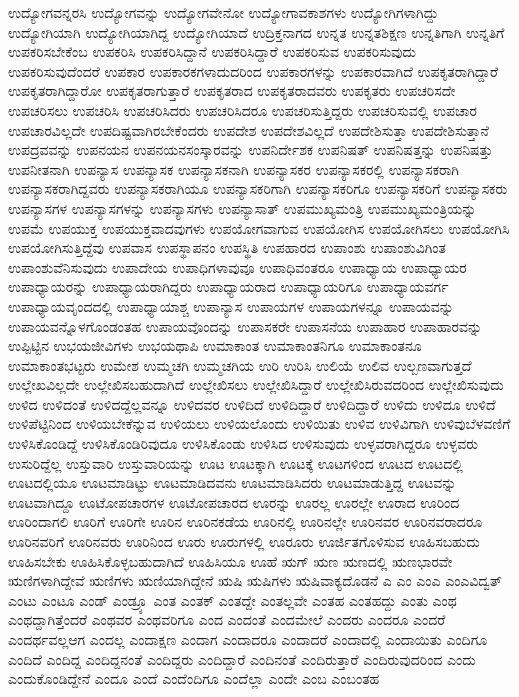 {ಉದ್ಯೋಗವನ್ನರಸಿ
ಉದ್ಯೋಗವನ್ನು
ಉದ್ಯೋಗವೇನೋ
ಉದ್ಯೋಗಾವಕಾಶಗಳು
ಉದ್ಯೋಗಿಗಳಾಗಿದ್ದು
ಉದ್ಯೋಗಿಯಾಗಿ
ಉದ್ಯೋಗಿಯಾಗಿದ್ದ
ಉದ್ಯೋಗಿಯಾದೆ
ಉದ್ರಿಕ್ತನಾಗದ
ಉನ್ನತ
ಉನ್ನತಶಿಕ್ಷಣ
ಉನ್ನತಿಗಾಗಿ
ಉನ್ನತಿಗೆ
ಉಪಕರಿಸಬೇಕೆಂಬ
ಉಪಕರಿಸಿ
ಉಪಕರಿಸಿದ್ದಾನೆ
ಉಪಕರಿಸಿದ್ದಾರೆ
ಉಪಕರಿಸುವ
ಉಪಕರಿಸುವುದು
ಉಪಕರಿಸುವುದೆಂದರೆ
ಉಪಕಾರ
ಉಪಕಾರಕಗಳಾದುದರಿಂದ
ಉಪಕಾರಗಳನ್ನು
ಉಪಕಾರವಾಗಿದೆ
ಉಪಕೃತರಾಗಿದ್ದಾರೆ
ಉಪಕೃತರಾಗಿದ್ದಾರೋ
ಉಪಕೃತರಾಗುತ್ತಾರೆ
ಉಪಕೃತರಾದ
ಉಪಕೃತರಾದವರು
ಉಪಕೃತರು
ಉಪಚರಿಸದೇ
ಉಪಚರಿಸಲು
ಉಪಚರಿಸಿ
ಉಪಚರಿಸಿದರು
ಉಪಚರಿಸಿದರೂ
ಉಪಚರಿಸುತ್ತಿದ್ದರು
ಉಪಚರಿಸುವಲ್ಲಿ
ಉಪಚಾರ
ಉಪಚಾರವಿಲ್ಲದೇ
ಉಪದಿಷ್ಟವಾಗಿರಬೇಕೆಂದರು
ಉಪದೇಶ
ಉಪದೇಶವಿಲ್ಲದೆ
ಉಪದೇಶಿಸುತ್ತಾ
ಉಪದೇಶಿಸುತ್ತಾನೆ
ಉಪದ್ರವವನ್ನು
ಉಪನಯನ
ಉಪನಯನಸಂಸ್ಕಾರವನ್ನು
ಉಪನಿರ್ದೇಶಕ
ಉಪನಿಷತ್
ಉಪನಿಷತ್ತನ್ನು
ಉಪನಿಷತ್ತು
ಉಪನೀತನಾಗಿ
ಉಪನ್ಯಾಸ
ಉಪನ್ಯಾಸಕ
ಉಪನ್ಯಾಸಕನಾಗಿ
ಉಪನ್ಯಾಸಕರ
ಉಪನ್ಯಾಸಕರಲ್ಲಿ
ಉಪನ್ಯಾಸಕರಾಗಿ
ಉಪನ್ಯಾಸಕರಾಗಿದ್ದವರು
ಉಪನ್ಯಾಸಕರಾಗಿಯೂ
ಉಪನ್ಯಾಸಕರಿಗಾಗಿ
ಉಪನ್ಯಾಸಕರಿಗೂ
ಉಪನ್ಯಾಸಕರಿಗೆ
ಉಪನ್ಯಾಸಕರು
ಉಪನ್ಯಾಸಗಳ
ಉಪನ್ಯಾಸಗಳನ್ನು
ಉಪನ್ಯಾಸಗಳು
ಉಪನ್ಯಾಸಾತ್
ಉಪಮುಖ್ಯಮಂತ್ರಿ
ಉಪಮುಖ್ಯಮಂತ್ರಿಯನ್ನು
ಉಪಮೆ
ಉಪಯುಕ್ತ
ಉಪಯುಕ್ತವಾದವುಗಳು
ಉಪಯೋಗವಾಗುವ
ಉಪಯೋಗಿಸ
ಉಪಯೋಗಿಸಲು
ಉಪಯೋಗಿಸಿ
ಉಪಯೋಗಿಸುತ್ತಿದ್ದೆವು
ಉಪವಾಸ
ಉಪಸ್ಥಾಪನಂ
ಉಪಸ್ಥಿತಿ
ಉಪಹಾರದ
ಉಪಾಂಶು
ಉಪಾಂಶುವಿಗಿಂತ
ಉಪಾಂಶುವೆನಿಸುವುದು
ಉಪಾದೇಯ
ಉಪಾಧಿಗಳಾವುವೂ
ಉಪಾಧಿವಂತರೂ
ಉಪಾಧ್ಯಾಯ
ಉಪಾಧ್ಯಾಯರ
ಉಪಾಧ್ಯಾಯರನ್ನು
ಉಪಾಧ್ಯಾಯರಾಗಿದ್ದರು
ಉಪಾಧ್ಯಾಯರಾದ
ಉಪಾಧ್ಯಾಯರಿಗೂ
ಉಪಾಧ್ಯಾಯವರ್ಗ
ಉಪಾಧ್ಯಾಯವೃಂದದಲ್ಲಿ
ಉಪಾಧ್ಯಾಯಾಶ್ಚ
ಉಪಾನ್ಯಾಸ
ಉಪಾಯಗಳ
ಉಪಾಯಗಳನ್ನೂ
ಉಪಾಯವನ್ನು
ಉಪಾಯವನ್ನೊಳಗೊಂಡಂತಹ
ಉಪಾಯವೊಂದನ್ನು
ಉಪಾಸಕರೇ
ಉಪಾಸನೆಯ
ಉಪಾಹಾರ
ಉಪಾಹಾರವನ್ನು
ಉಪ್ಪಿಟ್ಟಿನ
ಉಭಯಜೀವಿಗಳು
ಉಭಯಥಾಪಿ
ಉಮಾಕಾಂತ
ಉಮಾಕಾಂತನಿಗೂ
ಉಮಾಕಾಂತನೂ
ಉಮಾಕಾಂತಭಟ್ಟರು
ಉಮೇಶ
ಉಮ್ಮಚಗಿ
ಉಮ್ಮಚಗಿಯ
ಉರಿ
ಉರಿಸಿ
ಉಲಿಯೆ
ಉಲಿವ
ಉಲ್ಬಣವಾಗುತ್ತದೆ
ಉಲ್ಲೇಖವಿಲ್ಲದೇ
ಉಲ್ಲೇಖಿಸಬಹುದಾಗಿದೆ
ಉಲ್ಲೇಖಿಸಲು
ಉಲ್ಲೇಖಿಸಿದ್ದಾರೆ
ಉಲ್ಲೇಖಿಸಿರುವದರಿಂದ
ಉಲ್ಲೇಖಿಸುವುದು
ಉಳಿದ
ಉಳಿದಂತೆ
ಉಳಿದದ್ದೆಲ್ಲವನ್ನೂ
ಉಳಿದವರ
ಉಳಿದಿದೆ
ಉಳಿದಿದ್ದಾರೆ
ಉಳಿದಿದ್ದಾರೆ
ಉಳಿದು
ಉಳಿದೂ
ಉಳಿದೆ
ಉಳಿಪೆಟ್ಟಿನಿಂದ
ಉಳಿಯಬೇಕೆನ್ನುವ
ಉಳಿಯಲು
ಉಳಿಯಲೊಂದು
ಉಳಿಯಿತು
ಉಳಿವ
ಉಳಿವಿಗಾಗಿ
ಉಳಿವುಬೆಳವಣಿಗೆ
ಉಳಿಸಿಕೊಂಡಿದ್ದೆ
ಉಳಿಸಿಕೊಂಡಿರಿವುದೂ
ಉಳಿಸಿಕೊಂಡು
ಉಳಿಸಿದ
ಉಳಿಸುವುದು
ಉಳ್ಳವರಾಗಿದ್ದರೂ
ಉಳ್ಳವರು
ಉಸುರಿದ್ದೆಲ್ಲ
ಉಸ್ತುವಾರಿ
ಉಸ್ತುವಾರಿಯನ್ನು
ಊಟ
ಊಟಕ್ಕಾಗಿ
ಊಟಕ್ಕೆ
ಊಟಗಳಿಂದ
ಊಟದ
ಊಟದಲ್ಲಿ
ಊಟದಲ್ಲಿಯೂ
ಊಟಮಾಡಿಟ್ಟು
ಊಟಮಾಡಿದವನು
ಊಟಮಾಡಿಸಿದರು
ಊಟಮಾಡುತ್ತಿದ್ದ
ಊಟವನ್ನು
ಊಟವಾಗಿದ್ದೂ
ಊಟೋಪಚಾರಗಳ
ಊಟೋಪಚಾರದ
ಊರನ್ನು
ಊರಲ್ಲ
ಊರಲ್ಲೇ
ಊರಾದ
ಊರಿಂದ
ಊರಿಂದಾಗಲಿ
ಊರಿಗೆ
ಊರಿಗೇ
ಊರಿನ
ಊರಿನಕಡೆಯ
ಊರಿನಲ್ಲಿ
ಊರಿನಲ್ಲೇ
ಊರಿನವರ
ಊರಿನವರಾದರೂ
ಊರಿನವರಿಗೆ
ಊರಿನವರು
ಊರಿನಿಂದ
ಊರು
ಊರುಗಳಲ್ಲಿ
ಊರೂರು
ಊರ್ಜಿತಗೊಳಿಸುವ
ಊಹಿಸಬಹುದು
ಊಹಿಸಬೇಕು
ಊಹಿಸಿಕೊಳ್ಳಬಹುದಾಗಿದೆ
ಊಹಿಸಿಯೂ
ಊಹೆ
ಋಗ್
ಋಣ
ಋಣದಲ್ಲಿ
ಋಣಭಾರವೇ
ಋಣಿಗಳಾಗಿದ್ದೇವೆ
ಋಣಿಗಳು
ಋಣಿಯಾಗಿದ್ದೇನೆ
ಋಷಿ
ಋಷಿಗಳು
ಋಷಿವಾಕ್ಯದೊಡನೆ
ಎ
ಎಂ
ಎಂಎ
ಎಂಎವಿದ್ವತ್
ಎಂಟು
ಎಂಟೂ
ಎಂಡ್
ಎಂಡ್ರ್ಯೂ
ಎಂತ
ಎಂತಕ್
ಎಂತದ್ದೇ
ಎಂತಲ್ಲವೇ
ಎಂತಹ
ಎಂತಹದ್ದು
ಎಂತು
ಎಂಥ
ಎಂಥದ್ದಾಗಿತ್ತೆಂದರೆ
ಎಂಥವರ
ಎಂಥವರಿಗೂ
ಎಂದ
ಎಂದಂತೆ
ಎಂದಮೇಲೆ
ಎಂದರು
ಎಂದರೂ
ಎಂದರೆ
ಎಂದರ್ಥವಲ್ಲಆಗ
ಎಂದಲ್ಲ
ಎಂದಾಕ್ಷಣ
ಎಂದಾಗ
ಎಂದಾದರೂ
ಎಂದಾದರೆ
ಎಂದಾದಲ್ಲಿ
ಎಂದಾಯಿತು
ಎಂದಿಗೂ
ಎಂದಿದೆ
ಎಂದಿದ್ದ
ಎಂದಿದ್ದನಂತೆ
ಎಂದಿದ್ದರು
ಎಂದಿದ್ದಾರೆ
ಎಂದಿನಂತೆ
ಎಂದಿರುತ್ತಾರೆ
ಎಂದಿರುವುದರಿಂದ
ಎಂದು
ಎಂದುಕೊಂಡಿದ್ದೇನೆ
ಎಂದೂ
ಎಂದೆ
ಎಂದೆಂದಿಗೂ
ಎಂದೆಲ್ಲಾ
ಎಂದೇ
ಎಂಬ
ಎಂಬಂತಹ
}
